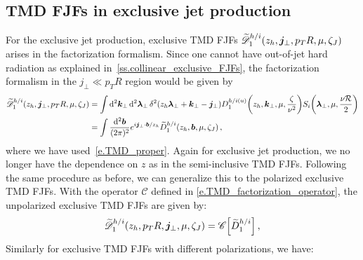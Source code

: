 \documentclass[a4paper, 11 pt]{article}
\begin{document}
\subsection{TMD FJFs in exclusive jet production}
\label{ss.exclusive_TMD_FJFs}
For the exclusive jet production, exclusive TMD FJFs $\widetilde{\mathscr{D}}_1^{h/i} \pqty{z_h, \boldsymbol{j}_{\perp}, p_T R,  \mu, \zeta_J}$ arises in the factorization formalism. Since one cannot have out-of-jet hard radiation as explained in~\cref{ss.collinear_exclusive_FJFs}, the factorization formalism in the $j_\perp \ll p_T R$ region would be given by
\begin{align}
\widetilde{\mathscr{D}}_1^{h/i} \pqty{z_h, \boldsymbol{j}_{\perp}, p_T R,  \mu, \zeta_J}
& =
\int \dd[2]{\boldsymbol{k}_{\perp}} \dd[2]{\boldsymbol{\lambda}_{\perp}}
\delta ^2 \pqty{z_h \boldsymbol{\lambda}_{\perp} + \boldsymbol{k}_{\perp} - \boldsymbol{j}_{\perp}}
D_1^{h/i(u)} \pqty{z_h, \boldsymbol{k}_{\perp}, \mu, \frac{\zeta}{\nu^2}}
S_i \pqty{\boldsymbol{\lambda}_{\perp}, \mu, \frac{\nu \mathcal{R}}{2}}
\nonumber \\
& = 
\int \frac{\dd[2]{\boldsymbol{b}}}{(2 \pi)^2} e^{i \boldsymbol{j}_{\perp} \cdot \boldsymbol{b} / z_h} \widetilde{D}_1^{h/i} \pqty{z_h, \boldsymbol{b}, \mu, \zeta_J} 
\, ,
\end{align}
where we have used~\cref{e.TMD_proper}. Again for exclusive jet production, we no longer have the dependence on $z$ as in the semi-inclusive TMD FJFs. 
Following the same procedure as before, we can generalize this to the polarized exclusive TMD FJFs. With the operator $\mathscr{C}$ defined in \cref{e.TMD_factorization_operator}, the unpolarized exclusive TMD FJFs are given by:
\begin{equation}
\widetilde{\mathscr{D}}_1^{h/i} \pqty{z_h, p_T {R}, \boldsymbol{j}_{\perp}, \mu, \zeta_J}
=
\mathscr{C} \bqty{\widetilde{D}_1^{h/i}}
\, ,
\end{equation}
Similarly for exclusive TMD FJFs with different polarizations, we have:
\end{document}

